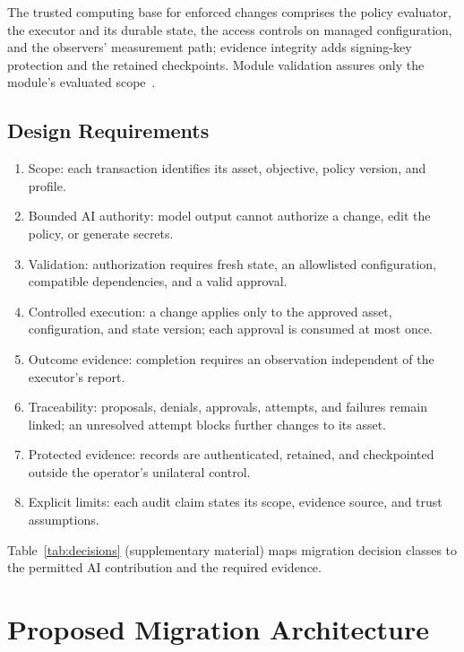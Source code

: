 The trusted computing base for enforced changes comprises the policy evaluator, the executor and its durable state, the access controls on managed configuration, and the observers' measurement path; evidence integrity adds signing-key protection and the retained checkpoints. Module validation assures only the module's evaluated scope~\cite{fips140}.

\subsection{Design Requirements}
\begin{enumerate}
\item Scope: each transaction identifies its asset, objective, policy version, and profile.
\item Bounded AI authority: model output cannot authorize a change, edit the policy, or generate secrets.
\item Validation: authorization requires fresh state, an allowlisted configuration, compatible dependencies, and a valid approval.
\item Controlled execution: a change applies only to the approved asset, configuration, and state version; each approval is consumed at most once.
\item Outcome evidence: completion requires an observation independent of the executor's report.
\item Traceability: proposals, denials, approvals, attempts, and failures remain linked; an unresolved attempt blocks further changes to its asset.
\item Protected evidence: records are authenticated, retained, and checkpointed outside the operator's unilateral control.
\item Explicit limits: each audit claim states its scope, evidence source, and trust assumptions.
\end{enumerate}
Table~\ref{tab:decisions} (supplementary material) maps migration decision classes to the permitted AI contribution and the required evidence.

\section{Proposed Migration Architecture}
\label{sec:arch}

